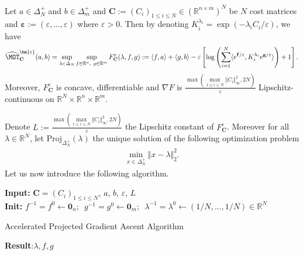 \begin{prop}
\label{prop:algo-dual}
Let $a\in\Delta_N^{+}$ and $b\in\Delta^+_m$ and $\mathbf{C}:=(C_i)_{1\leq i\leq N}\in\left(\mathbb{R}^{n\times m}\right)^N$ be $N$ cost matrices and $\bm{\varepsilon}:=(\varepsilon,...,\varepsilon)$ where $\varepsilon>0$. Then by denoting $K_i^{\lambda_i} =\exp\left(-\lambda_i C_{i}/\varepsilon\right)$, we have
\begin{align*}
\widehat{\MOT}_{\mathbf{C}}^{\bm{\varepsilon}}(a,b)=\sup_{\lambda\in\Delta_N}\sup\limits_{f\in \mathbb{R}^n,~g\in \mathbb{R}^m} F_{\mathbf{C}}^{\varepsilon}(\lambda,f,g):= \langle f, a\rangle+\langle g,b\rangle -\varepsilon\left[\log\left(\sum_{i=1}^N\langle e^{\mathbf{f}/\varepsilon},K_i^{\lambda_i} e^{\mathbf{g}/\varepsilon}\rangle \right) + 1\right].
\end{align*}
Moreover, $F_{\mathbf{C}}^{\varepsilon}$ is concave, differentiable and $\nabla F$ is $\frac{\max\left(\max\limits_{1\leq i\leq N}\Vert C_i\Vert_{\infty}^2,2N\right)}{\varepsilon}$ Lipschitz-continuous on $\mathbb{R}^N\times \mathbb{R}^n \times\mathbb{R}^m$.
\end{prop}
Denote $L:= \frac{\max\left(\max\limits_{1\leq i\leq N}\Vert C_i\Vert_{\infty}^2,2N\right)}{\varepsilon}$ the  Lipschitz constant of $F_{\mathbf{C}}^{\varepsilon}$. Moreover for all $\lambda\in\mathbb{R}^N$, let $\text{Proj}_{\Delta_N^{+}}(\lambda)$ the unique solution of the following optimization problem
\begin{align}
\label{prob:proj}
    \min_{x\in\Delta_N^{+}} \Vert x - \lambda\Vert_2^2.
\end{align}
Let us now introduce the following algorithm.

\begin{algorithm}[H]\label{algo:Proj-grad}
\SetAlgoLined
\textbf{Input:} $\mathbf{C}=(C_i)_{1\leq i\leq N}$, $a$, $b$, $\varepsilon$, $L$\\
\textbf{Init:} $f^{-1}=f^0 \leftarrow \mathbf{0}_n\text{;  }$ $g^{-1} = g^0 \leftarrow \mathbf{0}_m\text{;  }$ $\lambda^{-1} = \lambda^0 \leftarrow (1/N,...,1/N)\in\mathbb{R}^N$\\
\caption{Accelerated Projected Gradient Ascent Algorithm}
\textbf{Result}:$\lambda,f,g$
\end{algorithm}


